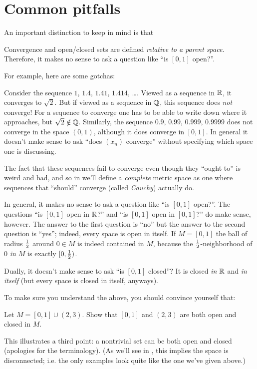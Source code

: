 \section{Common pitfalls}
An important distinction to keep in mind is that
\begin{moral}
	Convergence and open/closed sets are defined \emph{relative to a parent space}.
	Therefore, it makes no sense to ask a question like ``is $[0,1]$ open?''.
\end{moral}
For example, here are some gotchas:
\begin{itemize}
	\ii Consider the sequence $1$, $1.4$, $1.41$, $1.414$, \dots.
	Viewed as a sequence in $\mathbb R$, it converges to $\sqrt 2$.
	But if viewed as a sequence in $\mathbb Q$, this sequence does \emph{not} converge!
	For a sequence to converge one has to be able to write down where it approaches,
	but $\sqrt 2 \notin \mathbb Q$.
	Similarly, the sequence $0.9$, $0.99$, $0.999$, $0.9999$ does not converge in the space $(0,1)$,
	although it does converge in $[0,1]$.
	In general it doesn't make sense to ask
	``does $(x_n)$ converge'' without specifying which space one is discussing.

	The fact that these sequences fail to converge even though they ``ought to'' is weird and bad,
	and so in  we'll define a \emph{complete} metric space as one where sequences
	that ``should'' converge (called \emph{Cauchy}) actually do.

	\ii In general, it makes no sense to ask a question like ``is $[0,1]$ open?''.
	The questions ``is $[0,1]$ open in $\mathbb R$?'' and ``is $[0,1]$ open in $[0,1]$?'' do make sense, however.
	The answer to the first question is ``no'' but the answer to the second question is ``yes'';
	indeed, every space is open in itself.
	If $M = [0,1]$ the ball of radius $\frac{1}{2}$ around $0 \in M$ is indeed contained in $M$,
	because the $\frac{1}{2}$-neighborhood of $0$ \emph{in $M$} is exactly $[0,\frac{1}{2})$.

	\ii Dually, it doesn't make sense to ask ``is $[0,1]$ closed''?
	It is closed \emph{in $\mathbb R$} and \emph{in itself} (but every space is closed in itself, anyways).
\end{itemize}

To make sure you understand the above, you should convince yourself that:
\begin{exercise}
	Let $M = [0,1] \cup (2,3)$.
	Show that $[0,1]$ and $(2,3)$ are both open and closed in $M$.
\end{exercise}
This illustrates a third point:
a nontrivial set can be both open and closed (apologies for the terminology).
(As we'll see in , this implies the space is disconnected; i.e. the only
examples look quite like the one we've given above.)



